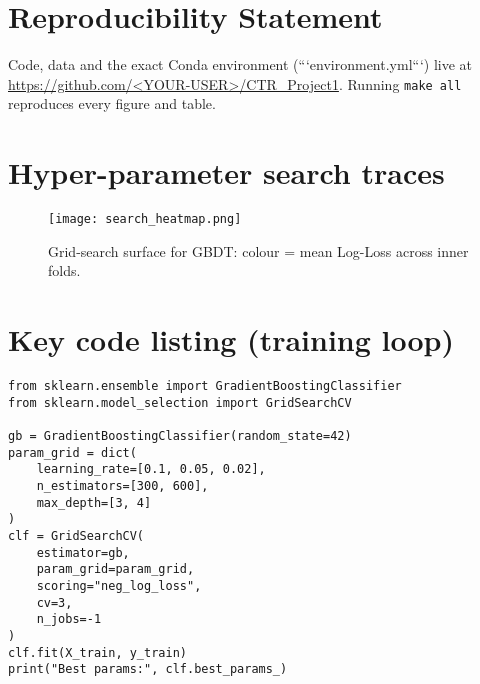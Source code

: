 \documentclass[12pt,a4paper]{article}
\begin{document}
\section*{Reproducibility Statement}

Code, data and the exact Conda environment
(```environment.yml```) live at  
\url{https://github.com/<YOUR-USER>/CTR_Project1}.  
Running \texttt{make all} reproduces every figure and table.

\appendix
\section{Hyper-parameter search traces}

\begin{figure}[H]
  \centering
  \texttt{[image: search\_heatmap.png]}
  \caption{Grid-search surface for GBDT:
           colour = mean Log-Loss across inner folds.}
\end{figure}

\section{Key code listing (training loop)}
\lstset{language=Python,basicstyle=\small\ttfamily,breaklines=true}
\begin{lstlisting}
from sklearn.ensemble import GradientBoostingClassifier
from sklearn.model_selection import GridSearchCV

gb = GradientBoostingClassifier(random_state=42)
param_grid = dict(
    learning_rate=[0.1, 0.05, 0.02],
    n_estimators=[300, 600],
    max_depth=[3, 4]
)
clf = GridSearchCV(
    estimator=gb,
    param_grid=param_grid,
    scoring="neg_log_loss",
    cv=3,
    n_jobs=-1
)
clf.fit(X_train, y_train)
print("Best params:", clf.best_params_)
\end{lstlisting}


\end{document}
